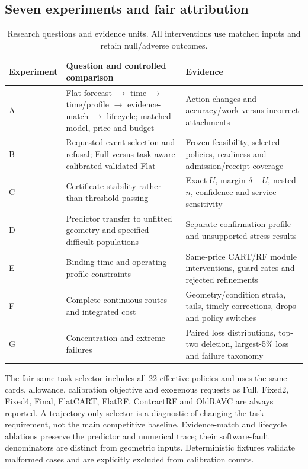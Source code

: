 \subsection{Seven experiments and fair attribution}
\begin{table}[t]\centering\small
\caption{Research questions and evidence units. All interventions use matched inputs and retain null/adverse outcomes.}\label{tab:experiments}
\begin{tabularx}{\linewidth}{@{}lXX@{}}\toprule
Experiment & Question and controlled comparison & Evidence\\\midrule
A & Flat forecast $\to$ time $\to$ time/profile $\to$ evidence-match $\to$ lifecycle; matched model, price and budget & Action changes and accuracy/work versus incorrect attachments\\
B & Requested-event selection and refusal; Full versus task-aware calibrated validated Flat & Frozen feasibility, selected policies, readiness and admission/receipt coverage\\
C & Certificate stability rather than threshold passing & Exact $U$, margin $\delta-U$, nested $n$, confidence and service sensitivity\\
D & Predictor transfer to unfitted geometry and specified difficult populations & Separate confirmation profile and unsupported stress results\\
E & Binding time and operating-profile constraints & Same-price CART/RF module interventions, guard rates and rejected refinements\\
F & Complete continuous routes and integrated cost & Geometry/condition strata, tails, timely corrections, drops and policy switches\\
G & Concentration and extreme failures & Paired loss distributions, top-two deletion, largest-5\% loss and failure taxonomy\\\bottomrule
\end{tabularx}
\end{table}

The fair same-task selector includes all 22 effective policies and uses the same cards, allowance, calibration objective and exogenous requests as Full. Fixed2, Fixed4, Final, FlatCART, FlatRF, ContractRF and OldRAVC are always reported. A trajectory-only selector is a diagnostic of changing the task requirement, not the main competitive baseline. Evidence-match and lifecycle ablations preserve the predictor and numerical trace; their software-fault denominators are distinct from geometric inputs. Deterministic fixtures validate malformed cases and are explicitly excluded from calibration counts.

